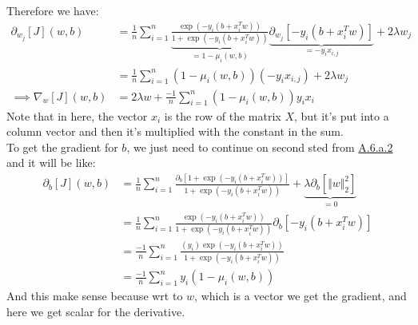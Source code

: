 \documentclass[]{article}
\begin{document}
        Therefore we have: 
        \begin{align*}\tag{A.6.a.4}\label{eqn:A.6.a.4}
            \partial_{w_j}[J](w, b)
            &= 
            \frac{1}{n}\sum_{i  = 1}^{n}
                \underbrace{\frac{
                    \exp(-y_i(b + x_i^T w))
                }
                {
                    1 + \exp(-y_i(b + x_i^T w))
                }}_{= 1- \mu_i(w, b)}\underbrace{\partial_{w_j}[-y_i(b +x_i^Tw)]}_{= -y_ix_{i,j}}
                + 2\lambda w_j
            \\
            &= 
            \frac{1}{n}\sum_{i  = 1}^{n}
                (1- \mu_i(w, b))(-y_i x_{i, j})
                + 2\lambda w_j
            \\
            \implies \nabla_w[J](w, b) &= 2\lambda w + \frac{-1}{n}\sum_{i = 1}^{n}
                (1 - \mu_i(w, b))y_ix_i
        \end{align*}
        Note that in here, the vector $x_i$ is the row of the matrix $X$, but it's put into a column vector and then it's multiplied with the constant in the sum. 
        \\
        To get the gradient for $b$, we just need to continue on second sted from \hyperref[eqn:A.6.a.2]{A.6.a.2} and it will be like: 
        \begin{align*}\tag{A.6.a.5}\label{eqn:A.6.a.5}
            \partial_{b}[J](w, b)
            &= 
            \frac{1}{n}\sum_{i  = 1}^{n}
                \frac{
                    \partial_{b}[1 + \exp(-y_i(b + x_i^T w))]
                }
                {
                    1 + \exp(-y_i(b + x_i^T w))
                }
                +
                \underbrace{\lambda\partial_{b}[\Vert w\Vert_2^2]}_{ = 0}
            \\
            &= 
            \frac{1}{n}\sum_{i  = 1}^{n}
                \frac{
                    \exp(-y_i(b + x_i^T w))
                }
                {
                    1 + \exp(-y_i(b + x_i^T w))
                }
                \partial_{b}[-y_i(b + x_i^Tw)]
            \\
            &=
            \frac{-1}{n}\sum_{i  = 1}^{n}
                \frac{
                    (y_i)\exp(-y_i(b + x_i^T w))
                }
                {
                    1 + \exp(-y_i(b + x_i^T w))
                }
            \\
            &=
            \frac{-1}{n}\sum_{i  = 1}^{n}
                y_i(1 - \mu_i(w, b))
        \end{align*}
        And this make sense because wrt to $w$, which is a vector we get the gradient, and here we get scalar for the derivative. 
\end{document}
